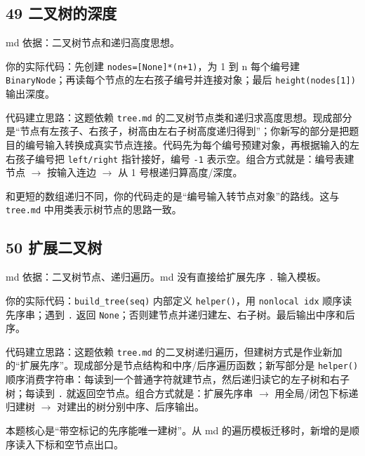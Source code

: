 \documentclass[10pt,a4paper,fontset=none]{ctexart}
\begin{document}
\subsection{49 二叉树的深度}
\begin{sourcebox}
md 依据：二叉树节点和递归高度思想。
\end{sourcebox}
\begin{methodbox}
你的实际代码：先创建 \texttt{nodes=[None]*(n+1)}，为 1 到 n 每个编号建 \texttt{BinaryNode}；再读每个节点的左右孩子编号并连接对象；最后 \texttt{height(nodes[1])} 输出深度。

代码建立思路：这题依赖 \texttt{tree.md} 的二叉树节点类和递归求高度思想。现成部分是“节点有左孩子、右孩子，树高由左右子树高度递归得到”；你新写的部分是把题目的编号输入转换成真实节点连接。代码先为每个编号预建对象，再根据输入的左右孩子编号把 \texttt{left/right} 指针接好，编号 \texttt{-1} 表示空。组合方式就是：编号表建节点 $\rightarrow$ 按输入连边 $\rightarrow$ 从 1 号根递归算高度/深度。
\end{methodbox}
和更短的数组递归不同，你的代码走的是“编号输入转节点对象”的路线。这与 \texttt{tree.md} 中用类表示树节点的思路一致。

\subsection{50 扩展二叉树}
\begin{sourcebox}
md 依据：二叉树节点、递归遍历。md 没有直接给扩展先序 \texttt{.} 输入模板。
\end{sourcebox}
\begin{methodbox}
你的实际代码：\texttt{build\_tree(seq)} 内部定义 \texttt{helper()}，用 \texttt{nonlocal idx} 顺序读先序串；遇到 \texttt{.} 返回 \texttt{None}；否则建节点并递归建左、右子树。最后输出中序和后序。

代码建立思路：这题依赖 \texttt{tree.md} 的二叉树递归遍历，但建树方式是作业新加的“扩展先序”。现成部分是节点结构和中序/后序遍历函数；新写部分是 \texttt{helper()} 顺序消费字符串：每读到一个普通字符就建节点，然后递归读它的左子树和右子树；每读到 \texttt{.} 就返回空节点。组合方式就是：扩展先序串 $\rightarrow$ 用全局/闭包下标递归建树 $\rightarrow$ 对建出的树分别中序、后序输出。
\end{methodbox}
本题核心是“带空标记的先序能唯一建树”。从 md 的遍历模板迁移时，新增的是顺序读入下标和空节点出口。
\end{document}
